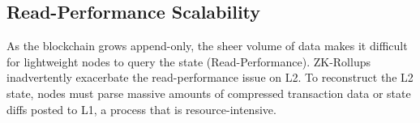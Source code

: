 \subsection{Read-Performance Scalability}
As the blockchain grows append-only, the sheer volume of data makes it difficult for lightweight nodes to query the state (Read-Performance). ZK-Rollups inadvertently exacerbate the read-performance issue on L2. To reconstruct the L2 state, nodes must parse massive amounts of compressed transaction data or state diffs posted to L1, a process that is resource-intensive.